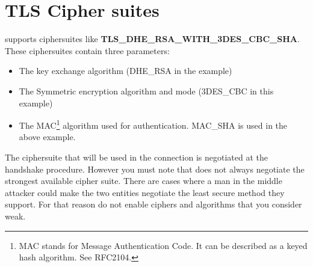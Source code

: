\newpage
\section{TLS Cipher suites}
\par 
\tlsI{} supports ciphersuites like {\bf TLS\_DHE\_RSA\_WITH\_3DES\_CBC\_SHA}.
These ciphersuites contain three parameters:
\begin{itemize}
\item The key exchange algorithm (DHE\_RSA in the example)
\item The Symmetric encryption algorithm and mode (3DES\_CBC in this
example)
\item The MAC\footnote{MAC stands for Message Authentication Code. It can
be described as a keyed hash algorithm. See RFC2104.} algorithm used for authentication.
MAC\_SHA is used in the above example.
\end{itemize}

The ciphersuite that will be used in the connection is negotiated at
the handshake procedure. However you must note that \tlsI does not always
negotiate the strongest available cipher suite. There are cases where
a man in the middle attacker could make the two entities negotiate
the least secure method they support. For that reason do not enable
ciphers and algorithms that you consider weak.

\addvspace{1.5cm}

